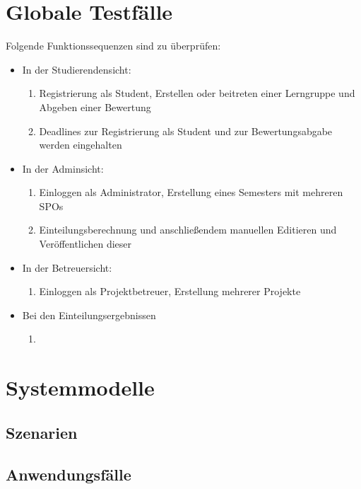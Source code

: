 \documentclass[parskip=full]{scrartcl}
\newcommand{\swtLabel}[1]{\textbf{/#1\arabic*0/}}
\begin{document}
\section{Globale Testfälle}
Folgende Funktionssequenzen sind zu überprüfen:

\begin{itemize}
  \item In der Studierendensicht:


\begin{enumerate} [label=\swtLabel{T}]
  
  
  \item Registrierung als Student, Erstellen oder beitreten einer Lerngruppe und Abgeben einer Bewertung
  \item Deadlines zur Registrierung als Student und zur Bewertungsabgabe werden eingehalten
  

\end{enumerate}
  \item In der Adminsicht:
   \begin{enumerate} [label=\swtLabel{T}, resume]
  \item Einloggen als Administrator, Erstellung eines Semesters mit mehreren SPOs
  \item Einteilungsberechnung und anschließendem manuellen Editieren und
  Veröffentlichen dieser
\end{enumerate}
  \item In der Betreuersicht:
   \begin{enumerate} [label=\swtLabel{T}, resume]
  \item Einloggen als Projektbetreuer, Erstellung mehrerer Projekte
\end{enumerate}
  \item Bei den Einteilungsergebnissen
   \begin{enumerate} [label=\swtLabel{T}, resume]
  \item 
\end{enumerate}
\end{itemize}

\section{Systemmodelle}

\subsection{Szenarien}

\subsection{Anwendungsfälle}
\end{document}
